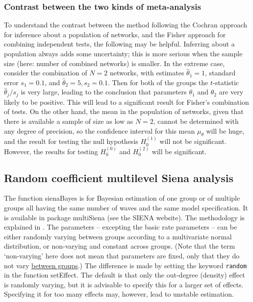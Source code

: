 \documentclass[a4paper,fleqn,11pt]{article}
\newcommand{\+}{\, + \,}
\newcommand{\sfn}[1]{\textsf{#1}}
\newcommand{\SI}{{\sf SIENA }}
\newcommand{\MS}{{\sf multiSiena }}
\begin{document}
\subsubsection{Contrast between the two kinds of meta-analysis }

To understand the contrast between the method following the Cochran approach
for inference about a population of networks,
and the Fisher approach for combining independent tests, the following
may be helpful.
Inferring about a population always adds some uncertainty;
this is more serious when the sample size (here: number of combined networks)
is smaller.
In the extreme case, consider the combination of $N=2$ networks,
with estimates $\hat\theta_1 = 1$, standard error $s_1 = 0.1$,
and $\hat\theta_2 = 5, s_2 = 0.1$.
Then for both of the groups the $t$-statistic $\hat\theta_j/s_j$ is very large,
leading to the conclusion that parameters $\theta_1$ and $\theta_2$
are very likely to be positive.
This will lead to a significant result for Fisher's combination of tests.
On the other hand, the mean in the population of networks, given that
there is available a sample of size as low as $N=2$, cannot be determined with
any degree of precision, so the confidence interval for this mean $\mu_\theta$
will be huge, and the result for testing the null hypothesis
$H_0^{(1)}$ will not be significant.
However, the results for testing $H_0^{(0)}$ and $H_0^{(2)}$
will be significant.


\subsection{Random coefficient multilevel Siena analysis}
\label{S_sienaBayes}

  The function \textsf{sienaBayes} is for Bayesian estimation of one group or
  of multiple groups all having the same number of waves and the same
  model specification.
  It is available in package \MS (see the \SI website).
  The methodology is explained in \citet{KoskinenSnijders2023}.
  The parameters -- excepting the basic rate parameters -- can be either
  randomly varying between groups according to a multivariate
  normal distribution, or non-varying and constant across groups.
  (Note that the term `non-varying' here does not mean that parameters
  are fixed, only that they do not vary \underline{between groups}.)
  The difference is made by setting the keyword \texttt{random} in
  the function \sfn{setEffect}. The default is that only the out-degree (density)
  effect is randomly varying, but it is advisable to specify
  this for a larger set of effects.
  Specifying it for too many effects may, however, lead to unstable estimation.
\end{document}
